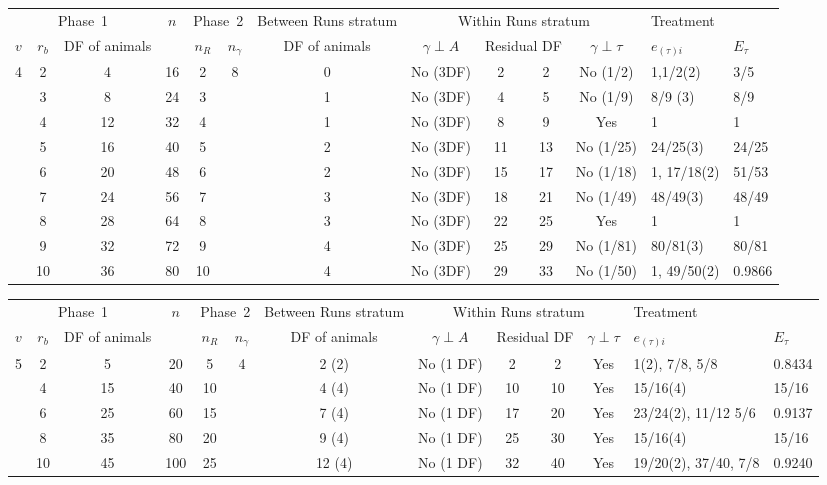 \documentclass[a4paper,11pt]{article}
\begin{document}
\begin{landscape}
\begin{tabular}[t]{|c|c|c|c|c|c|c|c|c|c|c|p{1in}|p{0.4in}|} \hline
\multicolumn{3}{|c|}{Phase~1}  & $n$  & \multicolumn{2}{c|}{Phase~2} & Between Runs stratum  & \multicolumn{4}{c|}{Within Runs stratum} & \multicolumn{2}{p{1.4in}|}{Treatment} \\ \cline{1-3} \cline{5-6}\cline{7-13}
$v$ & $r_b$ & DF of animals &  & $n_R$ & $n_\gamma$ & DF of animals &  $\gamma \perp A$ & \multicolumn{2}{c|}{Residual DF} & $\gamma \perp \tau$ & $e_{(\tau)i}$ &$E_\tau$\\ \hline
4 & 2 & 4 & 16 & 2 & 8 & 0 & No (3DF) & 2 & 2 & No (1/2) & 1,1/2(2) & 3/5 \\ \hline 
 & 3 & 8 & 24 & 3 &  & 1 & No (3DF) & 4 & 5 & No (1/9) & 8/9 (3) & 8/9 \\ \hline 
 & 4 & 12 & 32 & 4 &  & 1 & No (3DF) & 8 & 9 & Yes & 1 & 1 \\ \hline 
 & 5 & 16 & 40 & 5 &  & 2 & No (3DF) & 11 & 13 & No (1/25) & 24/25(3) & 24/25 \\ \hline 
 & 6 & 20 & 48 & 6 &  & 2 & No (3DF) & 15 & 17 & No (1/18) & 1, 17/18(2) & 51/53 \\ \hline 
 & 7 & 24 & 56 & 7 &  & 3 & No (3DF) & 18 & 21 & No (1/49) & 48/49(3) & 48/49 \\ \hline 
 & 8 & 28 & 64 & 8 &  & 3 & No (3DF) & 22 & 25 & Yes & 1 & 1 \\ \hline 
 & 9 & 32 & 72 & 9 &  & 4 & No (3DF) & 25 & 29 & No (1/81) & 80/81(3) & 80/81 \\ \hline 
 & 10 & 36 & 80 & 10 &  & 4 & No (3DF) & 29 & 33 & No (1/50) & 1, 49/50(2) & 0.9866 \\ \hline 
\end{tabular}

\begin{tabular}[t]{|c|c|c|c|c|c|c|c|c|c|c|p{1in}|p{0.4in}|} \hline
\multicolumn{3}{|c|}{Phase~1}  & $n$  & \multicolumn{2}{c|}{Phase~2} & Between Runs stratum  & \multicolumn{4}{c|}{Within Runs stratum} & \multicolumn{2}{p{1.4in}|}{Treatment} \\ \cline{1-3} \cline{5-6}\cline{7-13}
$v$ & $r_b$ & DF of animals &  & $n_R$ & $n_\gamma$ & DF of animals &  $\gamma \perp A$ & \multicolumn{2}{c|}{Residual DF} & $\gamma \perp \tau$ & $e_{(\tau)i}$ &$E_\tau$\\ \hline
5 & 2 & 5 & 20 & 5 & 4 & 2 (2) & No (1 DF) & 2 & 2 & Yes & 1(2), 7/8, 5/8 & 0.8434 \\ \hline 
 & 4 & 15 & 40 & 10 &  & 4 (4) & No (1 DF) & 10 & 10 & Yes & 15/16(4) & 15/16 \\ \hline 
 & 6 & 25 & 60 & 15 &  & 7 (4) & No (1 DF) & 17 & 20 & Yes & 23/24(2), 11/12   5/6 & 0.9137 \\ \hline 
 & 8 & 35 & 80 & 20 &  & 9 (4) & No (1 DF) & 25 & 30 & Yes & 15/16(4) & 15/16 \\ \hline 
 & 10 & 45 & 100 & 25 &  & 12 (4) & No (1 DF) & 32 & 40 & Yes & 19/20(2), 37/40,   7/8 & 0.9240 \\ \hline 
\end{tabular}



\end{landscape}
\end{document}
